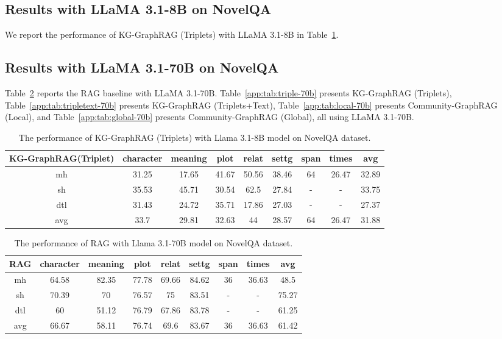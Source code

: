 \subsection{Results with LLaMA 3.1-8B on NovelQA}
We report the performance of KG-GraphRAG (Triplets) with LLaMA 3.1-8B in Table~\ref{app:tab:triple-8b}.

\subsection{Results with LLaMA 3.1-70B on NovelQA}
Table~\ref{app:tab:rag-70b} reports the RAG baseline with LLaMA 3.1-70B.
Table~\ref{app:tab:triple-70b} presents KG-GraphRAG (Triplets),
Table~\ref{app:tab:tripletext-70b} presents KG-GraphRAG (Triplets+Text),
Table~\ref{app:tab:local-70b} presents Community-GraphRAG (Local), and
Table~\ref{app:tab:global-70b} presents Community-GraphRAG (Global),
all using LLaMA 3.1-70B.

\begin{table}[!htb]
\caption{The performance of KG-GraphRAG (Triplets) with Llama 3.1-8B model on NovelQA dataset.}
\label{app:tab:triple-8b}
\centering
\begin{tabular}{c|cccccccc}
\hline
KG-GraphRAG(Triplet) & character & meaning & plot  & relat & settg & span & times & avg   \\ \hline
mh                   & 31.25     & 17.65   & 41.67 & 50.56 & 38.46 & 64   & 26.47 & 32.89 \\
sh                   & 35.53     & 45.71   & 30.54 & 62.5  & 27.84 & -    & -     & 33.75 \\
dtl                  & 31.43     & 24.72   & 35.71 & 17.86 & 27.03 & -    & -     & 27.37 \\
avg                  & 33.7      & 29.81   & 32.63 & 44    & 28.57 & 64   & 26.47 & 31.88 \\ \hline
\end{tabular}
\end{table}

\begin{table}[!htb]
\caption{The performance of RAG with Llama 3.1-70B model on NovelQA dataset.}
\label{app:tab:rag-70b}
\centering
\begin{tabular}{c|cccccccc}
\hline
RAG & character & meaning & plot  & relat & settg & span & times & avg   \\ \hline
mh  & 64.58     & 82.35   & 77.78 & 69.66 & 84.62 & 36   & 36.63 & 48.5  \\
sh  & 70.39     & 70      & 76.57 & 75    & 83.51 & -    & -     & 75.27 \\
dtl & 60        & 51.12   & 76.79 & 67.86 & 83.78 & -    & -     & 61.25 \\
avg & 66.67     & 58.11   & 76.74 & 69.6  & 83.67 & 36   & 36.63 & 61.42 \\ \hline
\end{tabular}
\end{table}

